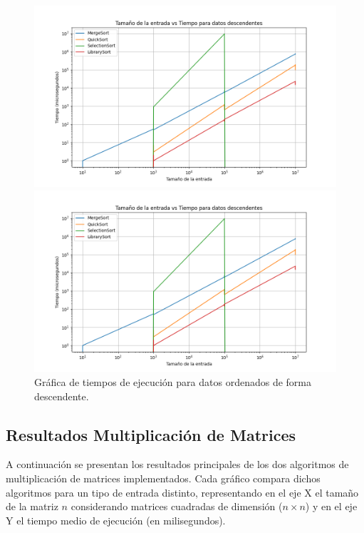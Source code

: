 \begin{figure}[H]
    \centering
    \begin{minipage}[t]{0.5\textwidth}
        \includegraphics[width=\textwidth]{../code/sorting/data/plots/descendente_plot.png}
    \end{minipage}%
    \begin{minipage}[t]{0.5\textwidth}
        \includegraphics[width=\textwidth]{../code/sorting/data/plots/descendente_plot.png}
     \end{minipage}%
    \caption{Gráfica de tiempos de ejecución para datos ordenados de forma descendente.}
    \label{fig:sorting-descendente}
\end{figure}


\newpage

\subsection*{Resultados Multiplicación de Matrices}

A continuación se presentan los resultados principales de los dos algoritmos de multiplicación de matrices implementados. Cada gráfico compara dichos algoritmos para un tipo de entrada distinto, representando en el eje X el tamaño de la matriz $n$ considerando matrices cuadradas de dimensión ($n \times n$) y en el eje Y el tiempo medio de ejecución (en milisegundos).

